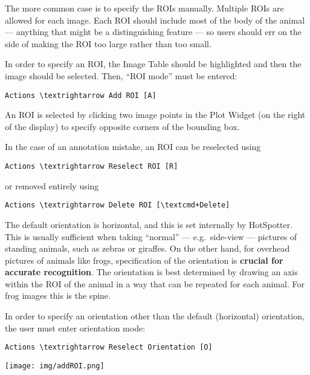 \documentclass[a4paper,10pt]{article}
\begin{document}
        The more common case is to specify the ROIs manually.  Multiple ROIs are allowed for each
        image.  Each ROI should include most of the body of the animal ---
        anything that might be a distinguishing feature --- so users should err on the
        side of making the ROI too large rather than too small.

        In order to specify an ROI, the Image Table should be
        highlighted and then the image should be selected.  Then,
        ``ROI mode'' must be entered:
        \begin{Verbatim}[commandchars=\\\{\}]
        Actions \textrightarrow Add ROI [A]
        \end{Verbatim}
        An ROI is selected by clicking two image points in the Plot
        Widget (on the right of the display) to specify opposite corners of the
        bounding box.

        \;

        In the case of an annotation mistake, an ROI can be reselected using 
        \begin{Verbatim}[commandchars=\\\{\}]
        Actions \textrightarrow Reselect ROI [R]
        \end{Verbatim}
        or removed entirely using 
        \begin{Verbatim}[commandchars=\\\{\}]
        Actions \textrightarrow Delete ROI [\textcmd+Delete]
        \end{Verbatim}

        The default orientation is horizontal, and this is set
        internally by HotSpotter.  This is usually sufficient when
        taking ``normal'' --- e.g.\ side-view --- pictures of standing
        animals, such as zebras or giraffes.  On the other hand, for overhead
        pictures of animals like frogs, specification of the
        orientation is \textbf{crucial for accurate recognition}.  The
        orientation is best determined by drawing an axis within the
        ROI of the animal in a way that can be repeated for each
        animal.  For frog images this is the spine.

        In order to specify an orientation other than the default
        (horizontal) orientation, the user must enter orientation
        mode:
        \begin{Verbatim}[commandchars=\\\{\}]
        Actions \textrightarrow Reselect Orientation [O]
        \end{Verbatim}
        \begin{center}
            \texttt{[image: img/addROI.png]}
        \end{center}
\end{document}
